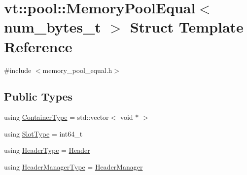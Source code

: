 \hypertarget{structvt_1_1pool_1_1_memory_pool_equal}{}\section{vt\+:\+:pool\+:\+:Memory\+Pool\+Equal$<$ num\+\_\+bytes\+\_\+t $>$ Struct Template Reference}
\label{structvt_1_1pool_1_1_memory_pool_equal}


{\ttfamily \#include $<$memory\+\_\+pool\+\_\+equal.\+h$>$}

\subsection*{Public Types}
\begin{DoxyCompactItemize}
\item 
using \hyperlink{structvt_1_1pool_1_1_memory_pool_equal_af0be2ff27778be95adc6dad823113c27}{Container\+Type} = std\+::vector$<$ void $\ast$ $>$
\item 
using \hyperlink{structvt_1_1pool_1_1_memory_pool_equal_a101fdcb943d0cb0863cf17655e0b4e1c}{Slot\+Type} = int64\+\_\+t
\item 
using \hyperlink{structvt_1_1pool_1_1_memory_pool_equal_a6b3a6a56431496ae69e1799c3d9856dc}{Header\+Type} = \hyperlink{structvt_1_1pool_1_1_header}{Header}
\item 
using \hyperlink{structvt_1_1pool_1_1_memory_pool_equal_a43bf2b08808f0f90aa1fc1588c7ffd08}{Header\+Manager\+Type} = \hyperlink{structvt_1_1pool_1_1_header_manager}{Header\+Manager}
\end{DoxyCompactItemize}
